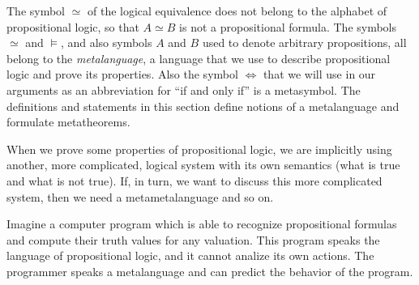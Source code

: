 

\setcounter{section}{1}
\setcounter{subsection}{3}
\setcounter{dfn}{8}

\begin{rem}
The symbol $\simeq$ of the logical equivalence does not belong to the alphabet of propositional logic, so that $A \simeq B$ is not a propositional formula.
The symbols $\simeq$ and $\vDash$, and also symbols $A$ and $B$ used to denote arbitrary propositions,
all belong to the \emph{metalanguage}, a language that we use to describe propositional logic and prove its properties.
Also the symbol $\Leftrightarrow$ that we will use in our arguments as an abbreviation for ``if and only if'' is a metasymbol.
The definitions and statements in this section define notions of a metalanguage and formulate metatheorems.

When we prove some properties of propositional logic,
we are implicitly using another, more complicated, logical system with its own semantics (what is true and what is not true).
If, in turn, we want to discuss this more complicated system, then we need a metametalanguage and so on.

Imagine a computer program which is able to recognize propositional formulas and compute their truth values for any valuation.
This program speaks the language of propositional logic, and it cannot analize its own actions.
The programmer speaks a metalanguage and can predict the behavior of the program.
\end{rem}


